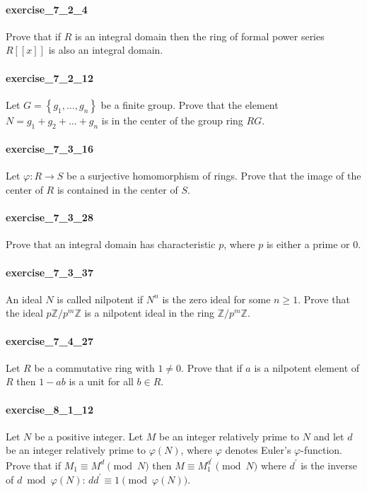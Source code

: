\documentclass{article}
\begin{document}
\paragraph{exercise\_7\_2\_4} Prove that if $R$ is an integral domain then the ring of formal power series $R[[x]]$ is also an integral domain.

\paragraph{exercise\_7\_2\_12} Let $G=\left\{g_{1}, \ldots, g_{n}\right\}$ be a finite group. Prove that the element $N=g_{1}+g_{2}+\ldots+g_{n}$ is in the center of the group ring $R G$.

\paragraph{exercise\_7\_3\_16} Let $\varphi: R \rightarrow S$ be a surjective homomorphism of rings. Prove that the image of the center of $R$ is contained in the center of $S$.

\paragraph{exercise\_7\_3\_28} Prove that an integral domain has characteristic $p$, where $p$ is either a prime or 0.

\paragraph{exercise\_7\_3\_37} An ideal $N$ is called nilpotent if $N^{n}$ is the zero ideal for some $n \geq 1$. Prove that the ideal $p \mathbb{Z} / p^{m} \mathbb{Z}$ is a nilpotent ideal in the ring $\mathbb{Z} / p^{m} \mathbb{Z}$.

\paragraph{exercise\_7\_4\_27} Let $R$ be a commutative ring with $1 \neq 0$. Prove that if $a$ is a nilpotent element of $R$ then $1-a b$ is a unit for all $b \in R$.

\paragraph{exercise\_8\_1\_12} Let $N$ be a positive integer. Let $M$ be an integer relatively prime to $N$ and let $d$ be an integer relatively prime to $\varphi(N)$, where $\varphi$ denotes Euler's $\varphi$-function. Prove that if $M_{1} \equiv M^{d} \pmod N$ then $M \equiv M_{1}^{d^{\prime}} \pmod N$ where $d^{\prime}$ is the inverse of $d \bmod \varphi(N)$: $d d^{\prime} \equiv 1 \pmod {\varphi(N)}$.
\end{document}
